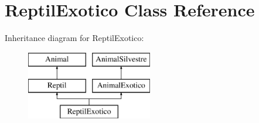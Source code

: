 \hypertarget{class_reptil_exotico}{}\section{Reptil\+Exotico Class Reference}
\label{class_reptil_exotico}
Inheritance diagram for Reptil\+Exotico\+:\begin{figure}[H]
\begin{center}
\leavevmode
\includegraphics[height=3.000000cm]{class_reptil_exotico}
\end{center}
\end{figure}
